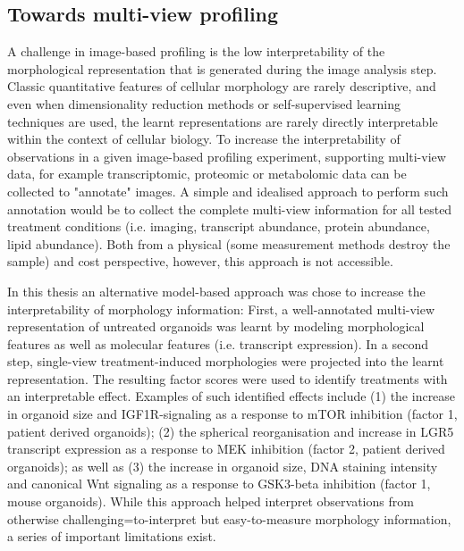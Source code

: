 \begin{flushleft}
\subsection{Towards multi-view profiling}
A challenge in image-based profiling is the low interpretability of the morphological representation that is generated during the image analysis step. Classic quantitative features of cellular morphology are rarely descriptive, and even when dimensionality reduction methods or self-supervised learning techniques are used, the learnt representations are rarely directly interpretable within the context of cellular biology. To increase the interpretability of observations in a given image-based profiling experiment, supporting multi-view data, for example transcriptomic, proteomic or metabolomic data can be collected to "annotate" images. A simple and idealised approach to perform such annotation would be to collect the complete multi-view information for all tested treatment conditions (i.e. imaging, transcript abundance, protein abundance, lipid abundance). Both from a physical (some measurement methods destroy the sample) and cost perspective, however, this approach is not accessible. 
\par

In this thesis an alternative model-based approach was chose to increase the interpretability of morphology information: First, a well-annotated multi-view representation of untreated organoids was learnt by modeling morphological features as well as molecular features (i.e. transcript expression). In a second step, single-view treatment-induced morphologies were projected into the learnt representation. The resulting factor scores were used to identify treatments with an interpretable effect. Examples of such identified effects include (1) the increase in organoid size and IGF1R-signaling as a response to mTOR inhibition (factor 1, patient derived organoids); (2) the spherical reorganisation and increase in LGR5 transcript expression as a response to MEK inhibition (factor 2, patient derived organoids); as well as (3) the increase in organoid size, DNA staining intensity and canonical Wnt signaling as a response to GSK3-beta inhibition (factor 1, mouse organoids). While this approach helped interpret observations from otherwise challenging=to-interpret but easy-to-measure morphology information, a series of important limitations exist.
\par


\end{flushleft}
